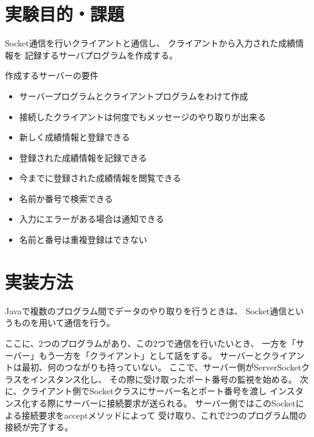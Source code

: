 \documentclass[dvipdfmx]{jsarticle}
\begin{document}
\section{実験目的・課題}

Socket通信を行いクライアントと通信し、
クライアントから入力された成績情報を
記録するサーバプログラムを作成する。

作成するサーバーの要件
\begin{itemize}
  \item サーバープログラムとクライアントプログラムをわけて作成
  \item 接続したクライアントは何度でもメッセージのやり取りが出来る
  \item 新しく成績情報と登録できる
  \item 登録された成績情報を記録できる
  \item 今までに登録された成績情報を閲覧できる
  \item 名前か番号で検索できる
  \item 入力にエラーがある場合は通知できる
  \item 名前と番号は重複登録はできない
\end{itemize}


\section{実装方法}
Javaで複数のプログラム間でデータのやり取りを行うときは、
Socket通信というものを用いて通信を行う。

ここに、2つのプログラムがあり、この2つで通信を行いたいとき、
一方を「サーバー」もう一方を「クライアント」として話をする。
サーバーとクライアントは最初、何のつながりも持っていない。
ここで、サーバー側がServerSocketクラスをインスタンス化し、
その際に受け取ったポート番号の監視を始める。
次に、クライアント側でSocketクラスにサーバー名とポート番号を渡し
インスタンス化する際にサーバーに接続要求が送られる。
サーバー側ではこのSocketによる接続要求をacceptメソッドによって
受け取り、これで2つのプログラム間の接続が完了する。
\end{document}
